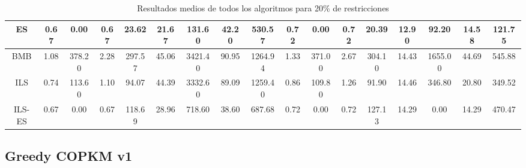 \begin{table}[H]
{{\begin{tabular}{|| c || c c c c || c c c c || c c c c || c c c c ||}
        \\
        \hline \hline
        ES &
        0.67 & 0.00 & 0.67 & 23.62 & 21.67 & 131.60 & 42.20 & 530.57 & 0.72 & 0.00 & 0.72 & 20.39 & 12.90 & 92.20 & 14.58 & 121.75
        \\
        \hline
        BMB &
        1.08 & 378.20 & 2.28 & 297.57 & 45.06 & 3421.40 & 90.95 & 1264.94 & 1.33 & 371.00 & 2.67 & 304.10 & 14.43 & 1655.00 & 44.69 & 545.88
        \\
        \hline
        ILS &
        0.74 & 113.60 & 1.10 & 94.07 & 44.39 & 3332.60 & 89.09 & 1259.40 & 0.86 & 109.80 & 1.26 & 91.90 & 14.46 & 346.80 & 20.80 & 349.52
        \\
        \hline
        ILS-ES &
        0.67 & 0.00 & 0.67 & 118.69 & 28.96 & 718.60 & 38.60 & 687.68 & 0.72 & 0.00 & 0.72 & 127.13 & 14.29 & 0.00 & 14.29 & 470.47
        \\
        \hline
    \end{tabular}
    }
    }
    \caption{Resultados medios de todos los algoritmos para 20\% de restricciones}
\end{table}

\vspace*{\fill}
\newpage


\subsection{Greedy COPKM v1}

\vspace*{\fill}

